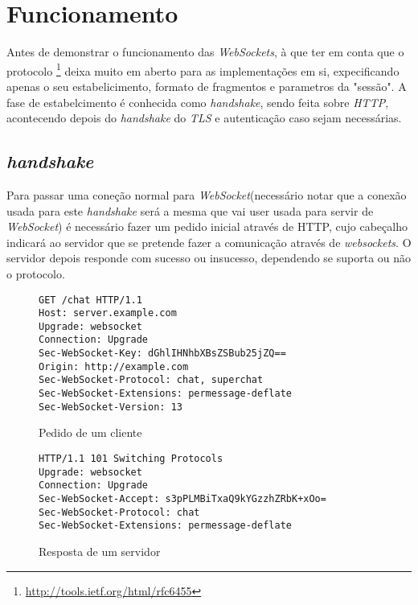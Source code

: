 \documentclass[a4paper]{article}
\begin{document}
\section{Funcionamento}

Antes de demonstrar o funcionamento das \emph{WebSockets}, à que ter em conta que o protocolo \footnote{\url{http://tools.ietf.org/html/rfc6455}} deixa muito em aberto para as implementações em si, expecificando apenas o seu estabelicimento, formato de fragmentos e parametros da "sessão". A fase de estabelcimento é conhecida como \emph{handshake}, sendo feita sobre \emph{HTTP}, acontecendo depois do \emph{handshake} do \emph{TLS} e autenticação caso sejam necessárias.

\subsection{\emph{handshake}}

Para passar uma coneção normal para \emph{WebSocket}(necessário notar que a conexão usada para este \emph{handshake} será a mesma que vai user usada para servir de \emph{WebSocket}) é necessário fazer um pedido inicial através de HTTP, cujo cabeçalho indicará ao servidor que se pretende fazer a comunicação através de \emph{websockets}. O servidor depois responde com sucesso ou insucesso, dependendo se suporta ou não o protocolo.

\begin{figure}[H]
	\begin{framed}
		\texttt{\small GET /chat HTTP/1.1 \\
						Host: server.example.com \\
						Upgrade: websocket\\
						Connection: Upgrade\\
						Sec-WebSocket-Key: dGhlIHNhbXBsZSBub25jZQ==\\
						Origin: http://example.com\\
						Sec-WebSocket-Protocol: chat, superchat\\
						Sec-WebSocket-Extensions: permessage-deflate\\
						Sec-WebSocket-Version: 13\\
		}		
	\end{framed}
	\caption{Pedido de um cliente}
  \label{fig:httpHeaderReq}
\end{figure}

\begin{figure}[H]
	\begin{framed}
		\texttt{\small HTTP/1.1 101 Switching Protocols\\
					Upgrade: websocket\\
					Connection: Upgrade\\
					Sec-WebSocket-Accept: s3pPLMBiTxaQ9kYGzzhZRbK+xOo=\\
					Sec-WebSocket-Protocol: chat\\
					Sec-WebSocket-Extensions: permessage-deflate\\
		}
	\end{framed}
		\caption{Resposta de um servidor}
  \label{fig:httpHeaderRspS}
\end{figure}
\end{document}
